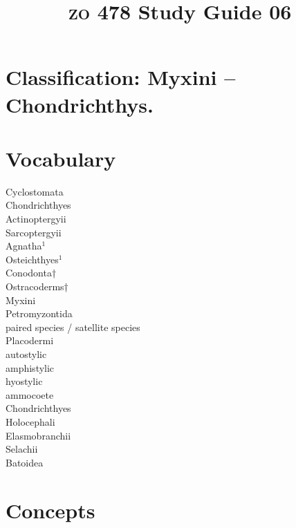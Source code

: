 \documentclass[letterpaper]{tufte-handout}
\title{{\scshape zo} 478 Study Guide 06}
\date{} %
\begin{document}
\maketitle	%

\section*{Classification: Myxini – Chondrichthys.}


\section{Vocabulary}  
\vspace{-1\baselineskip}
\begin{multicols}{2}
Cyclostomata \\
Chondrichthyes \\
Actinoptergyii \\
Sarcoptergyii \\
Agnatha$^1$ \\
Osteichthyes$^1$ \\
Conodonta† \\
Ostracoderms† \\
Myxini \\
Petromyzontida \\
paired species / satellite species \\
Placodermi \\
autostylic \\
amphistylic \\
hyostylic \\
ammocoete \\
Chondrichthyes \\
Holocephali \\
Elasmobranchii \\
Selachii \\
Batoidea 
\end{multicols}

\section{Concepts}
\end{document}
